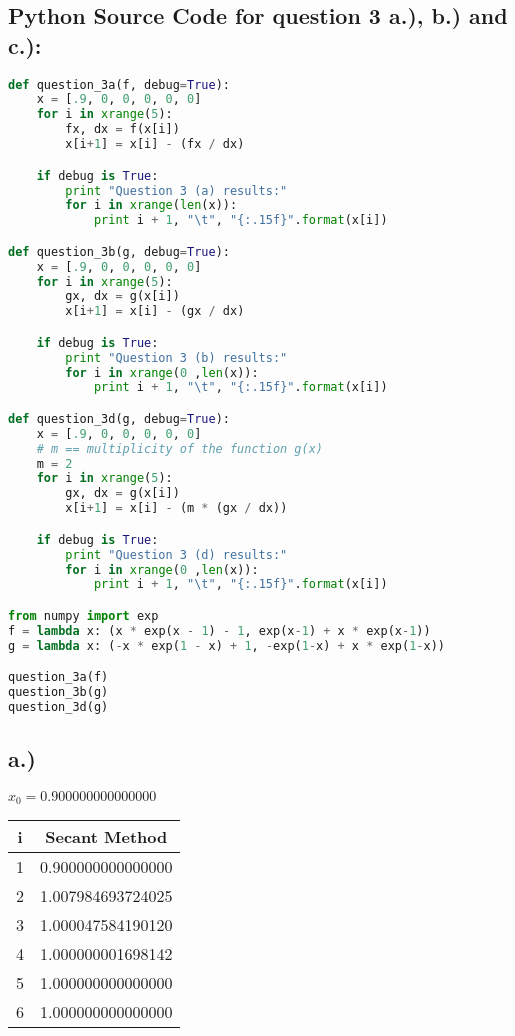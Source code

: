 \documentclass{article}
\begin{document}
\subsection*{Python Source Code for question 3 a.), b.) and c.): }
\begin{lstlisting}[language=Python]
def question_3a(f, debug=True):
    x = [.9, 0, 0, 0, 0, 0]
    for i in xrange(5):
        fx, dx = f(x[i])
        x[i+1] = x[i] - (fx / dx)

    if debug is True:
        print "Question 3 (a) results:"
        for i in xrange(len(x)):
            print i + 1, "\t", "{:.15f}".format(x[i])

def question_3b(g, debug=True):
    x = [.9, 0, 0, 0, 0, 0]
    for i in xrange(5):
        gx, dx = g(x[i])
        x[i+1] = x[i] - (gx / dx)

    if debug is True:
        print "Question 3 (b) results:"
        for i in xrange(0 ,len(x)):
            print i + 1, "\t", "{:.15f}".format(x[i])

def question_3d(g, debug=True):
    x = [.9, 0, 0, 0, 0, 0]
    # m == multiplicity of the function g(x)
    m = 2
    for i in xrange(5):
        gx, dx = g(x[i])
        x[i+1] = x[i] - (m * (gx / dx))

    if debug is True:
        print "Question 3 (d) results:"
        for i in xrange(0 ,len(x)):
            print i + 1, "\t", "{:.15f}".format(x[i])

from numpy import exp
f = lambda x: (x * exp(x - 1) - 1, exp(x-1) + x * exp(x-1))
g = lambda x: (-x * exp(1 - x) + 1, -exp(1-x) + x * exp(1-x))

question_3a(f)
question_3b(g)
question_3d(g)

\end{lstlisting}

\subsection*{a.)}

\textbf{$x_0 = 0.900000000000000$}
\begin{center}
    \begin{tabular}{||c c||}
    \hline
    \textbf{i} & \textbf{Secant Method} \\ [0.5ex]
    \hline\hline
    1 & 0.900000000000000 \\ [1ex]
    \hline
    2 & 1.007984693724025 \\ [1ex]
    \hline
    3 & 1.000047584190120 \\ [1ex]
    \hline
    4 & 1.000000001698142 \\ [1ex]
    \hline
    5 & 1.000000000000000 \\ [1ex]
    \hline
    6 & 1.000000000000000 \\ [1ex]
    \hline
    \end{tabular}
\end{center}
\end{document}
